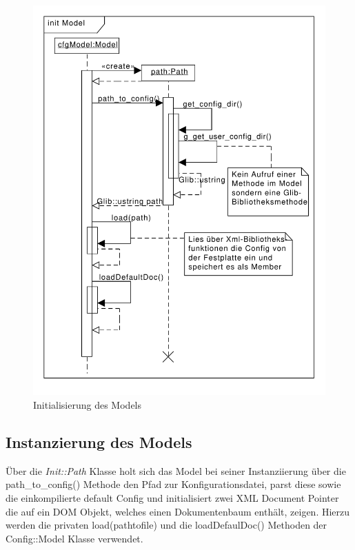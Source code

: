 \begin{figure}[htb!]
	\centering
  	\includegraphics[scale=0.6]{init.pdf}
	\caption{Initialisierung des Models}
	\label{c_modelinit}
\end{figure}


\subsection{Instanzierung des Models}

 
Über die \emph{Init::Path} Klasse holt sich das Model bei seiner Instanziierung über die path\_to\_config() Methode
den Pfad zur Konfigurationsdatei, parst diese sowie die einkompilierte default Config und 
initialisiert zwei XML Document Pointer die auf ein DOM Objekt, welches einen Dokumentenbaum enthält, zeigen.
Hierzu werden die privaten load(pathtofile) und die loadDefaulDoc() Methoden der Config::Model Klasse verwendet.
\\   

